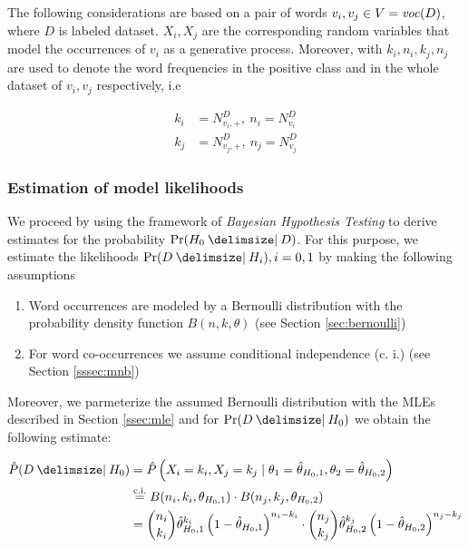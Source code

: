 The following considerations are based on a pair of words $v_i, v_j \in V=\mathit{voc}(D)$, where $D$ is labeled 
dataset. $X_i, X_j$ are the corresponding random variables that model the occurrences of $v_i$ as a generative process. 
Moreover, with $k_i, n_i, k_j, n_j$ are used to denote the word frequencies in the positive class and in the whole 
dataset of $v_i, v_j$ respectively, i.e

\begin{equation*}
\begin{split}
	k_i &= N_{v_i,+}^D,~n_i = N_{v_i}^D \\
	k_j &= N_{v_j,+}^D,~n_j = N_{v_j}^D	 
\end{split}
\end{equation*}   

\subsubsection{Estimation of model likelihoods}

We proceed by using the framework of \emph{Bayesian Hypothesis Testing} to derive estimates 
for the probability $\Pr(H_0 \given D)$. For this purpose, we estimate the likelihoods $\Pr(D \given H_i), i=0,1$ 
by making the following assumptions 
\begin{enumerate}
  \item Word occurrences are modeled by a Bernoulli distribution with the probability density function $B(n,k, \theta)$  (see Section \ref{sec:bernoulli}) 
  \item For word co-occurrences we assume conditional independence (c. i.) (see Section \ref{sssec:mnb})   
\end{enumerate}

Moreover, we parmeterize the assumed Bernoulli distribution with the MLEs described in Section \ref{ssec:mle} and for $\Pr(D \given H_0)$ 
we obtain the following estimate:

\begin{equation}
\begin{split}
\hat{P}(D \given H_0) &= \hat{P}\left(X_i=k_i, X_j=k_j \mid \theta_1 = \hat{\theta}_{H_0,1}, \theta_2 = \hat{\theta}_{H_0,2}\right) \\
				      &\stackrel{\text{c.i.}}{=} B(n_i,k_i,\theta_{H_0,1}) \cdot B(n_j,k_j,\theta_{H_0,2}) \\
					  &= \binom{n_i}{k_i}\hat{\theta}_{H_0,1}^{k_i}\left(1-\hat{\theta}_{H_0,1}\right)^{n_i-k_i}\cdot\binom{n_j}{k_j}\hat{\theta}_{H_0,2}^{k_j}\left(1-\hat{\theta}_{H_0,2}\right)^{n_j-k_j}
\end{split}
\end{equation}

